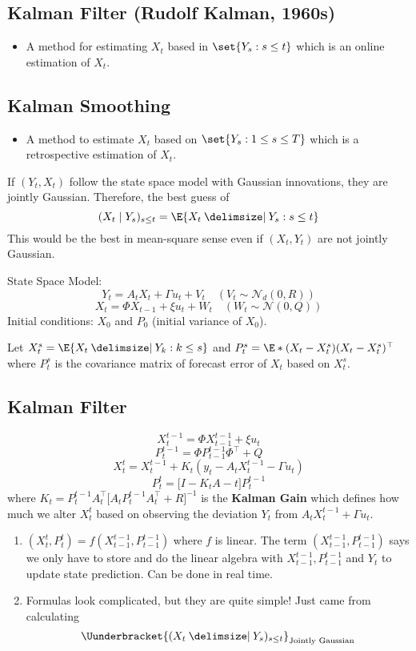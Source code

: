 \subsection*{Kalman Filter (Rudolf Kalman, 1960s)}
\begin{itemize}
    \item A method for estimating $ X_t $ based in $ \set{Y_s:s\le t} $
          which is an online estimation of $ X_t $.
\end{itemize}
\subsection*{Kalman Smoothing}
\begin{itemize}
    \item A method to estimate $ X_t $ based on $ \set{Y_s:1\le s\le T} $
          which is a retrospective estimation of $ X_t $.
\end{itemize}
\begin{Remark}{}{}
    If $ (Y_t,X_t) $ follow the state space model with Gaussian innovations,
    they are jointly Gaussian. Therefore, the best guess of
    \[ (X_t\mid Y_s)_{s\le t}=\E{X_t\given Y_s:s\le t} \]
    This would be the best in mean-square sense even if $ (X_t,Y_t) $ are not
    jointly Gaussian.
\end{Remark}
State Space Model:
\[ Y_t=A_t X_t+\Gamma u_t+V_t\quad (V_t \sim \mathcal{N}_d(0,R)) \]
\[ X_t=\Phi X_{t-1}+\xi u_t+W_t\quad (W_t \sim \mathcal{N}(0,Q)) \]
Initial conditions: $ X_0 $ and $ P_0 $ (initial variance of $ X_0 $).

Let $ X_t^s=\E{X_t\given Y_k:k\le s} $ and $ P_t^s=\E*{(X_t-X_t^s)(X_t-X_t^s)^\top} $
where $ P_t^s $ is the covariance matrix of forecast error of $ X_t $ based on $ X_t^s $.
\subsection*{Kalman Filter}
\[ X_t^{t-1}=\Phi X_{t-1}^{t-1}+\xi u_t \]
\[ P_t^{t-1}=\Phi P_{t-1}^{t-1}\Phi^\top +Q \]
\[ X_t^t = X_t^{t-1}+K_t(y_t-A_t X_t^{t-1}-\Gamma u_t) \]
\[ P_t^t=\bigl[I-K_t A-t\bigr]P_t^{t-1} \]
where $ K_t=P_t^{t-1}A_t^\top\bigl[A_t P_t^{t-1}A_t^\top +R\bigr]^{-1} $
is the \textbf{Kalman Gain} which defines how much we alter $ X_t^t $ based on
observing the deviation $ Y_t $ from $ A_t X_t^{t-1}+\Gamma u_t $.
\begin{Remark}{}{}
    \begin{enumerate}[(1)]
        \item $ (X_t^t,P_t^t)=f(X_{t-1}^{t-1},P_{t-1}^{t-1}) $ where $ f $ is linear.
              The term $ (X_{t-1}^{t-1},P_{t-1}^{t-1}) $ says we only have to store
              and do the linear algebra with $ X_{t-1}^{t-1}, P_{t-1}^{t-1} $
              and $ Y_t $ to update state prediction. Can be done in real time.
        \item Formulas look complicated, but they are quite simple! Just came
              from calculating
              \[ \Uunderbracket{(X_t\given Y_s)_{s\le t}}_{\text{Jointly Gaussian}} \]
    \end{enumerate}
\end{Remark}
